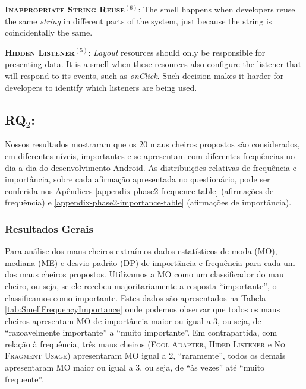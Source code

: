 \noindent
\textbf{\textsc{{\small Inappropriate String Reuse}}}$^{(6)}$:
The smell happens when developers reuse the same \textit{string} in different
parts of the system, just because the string is coincidentally the same.


\noindent
\textbf{\textsc{{\small Hidden Listener}}}$^{(5)}$:
\textit{Layout} resources should only be responsible for presenting data.
It is a smell when these resources also configure the listener that
will respond to its events, such as \textit{onClick}. Such decision
makes it harder for developers to identify which listeners are being used.

\subsection{RQ$_2$: \rqtwo}
\label{phase2-results}


Nossos resultados mostraram que os 20 maus cheiros propostos são considerados, em diferentes níveis, importantes e se apresentam com diferentes frequências no dia a dia do desenvolvimento Android. As distribuições relativas de frequência e importância, sobre cada afirmação apresentada no questionário, pode ser conferida nos Apêndices \ref{appendix-phase2-frequence-table} (afirmações de frequência) e \ref{appendix-phase2-importance-table} (afirmações de importância).


\subsubsection{Resultados Gerais}
\label{phase2-general-results}

Para análise dos maus cheiros extraímos dados estatísticos de moda (MO), mediana (ME) e desvio padrão (DP) de importância e frequência para cada um dos maus cheiros propostos. Utilizamos a MO como um classificador do mau cheiro, ou seja, se ele recebeu majoritariamente a resposta ``importante'', o classificamos como importante. Estes dados são apresentados na Tabela \ref{tab:SmellFrequencyImportance} onde podemos observar que todos os maus cheiros apresentam MO de importância maior ou igual a 3, ou seja, de ``razoavelmente importante'' a ``muito importante''. Em contrapartida, com relação à frequência, três maus cheiros (\textsc{\small Fool Adapter}, \textsc{\small Hided Listener} e \textsc{\small No Fragment Usage}) apresentaram MO igual a 2, ``raramente'', todos os demais apresentaram MO maior ou igual a 3, ou seja, de ``às vezes'' até ``muito frequente''.

